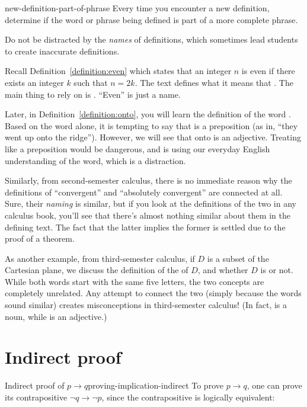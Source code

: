 \documentclass{book}
\theoremstyle{ekimcustom}
\newcommand\defn[1]{{\color{blue}{\bf #1}}}
\begin{document}
\begin{bhabit}{}{new-definition-part-of-phrase}
Every time you encounter a new definition, determine if the word or phrase being defined is part of a more complete phrase.
\end{bhabit}

Do not be distracted by the \emph{names} of definitions, which sometimes lead students to create inaccurate definitions.

Recall Definition~\ref{definition:even} which states that an integer $n$ is even if there exists an integer $k$ such that $n=2k$. The text  defines what it means that . The main thing to rely on is . ``Even'' is just a name.

Later, in Definition~\ref{definition:onto}, you will learn the definition of the word \defn{onto}. Based on the word alone, it is tempting to say that \defn{onto} is a preposition (as in, ``they went up onto the ridge''). However, we will see that onto is an adjective. Treating \defn{onto} like a preposition would be dangerous, and is using our everyday English understanding of the word, which is a distraction.

Similarly, from second-semester calculus, there is no immediate reason why the definitions of ``convergent'' and ``absolutely convergent'' are connected at all. Sure, their \emph{naming} is similar, but if you look at the definitions of the two in any calculus book, you'll see that there's almost nothing similar about them in the defining text. The fact that the latter implies the former is settled due to the proof of a theorem.

As another example, from third-semester calculus, if $D$ is a subset of the Cartesian plane, we discuss the definition of the \defn{boundary} of $D$, and whether $D$ is \defn{bounded} or not. While both words start with the same five letters, the two concepts are completely unrelated. Any attempt to connect the two (simply because the words sound similar) creates misconceptions in third-semester calculus! (In fact, \defn{boundary} is a noun, while \defn{bounded} is an adjective.)

\section{Indirect proof}\label{section:indirect-proof}

\begin{bmethod}{Indirect proof of $p \rightarrow q$}{proving-implication-indirect}
To prove $p \rightarrow q$, one can prove its contrapositive $\neg q \rightarrow \neg p$, since the contrapositive is logically equivalent:
\begin{center}
\end{center}
\end{bmethod}
\end{document}
